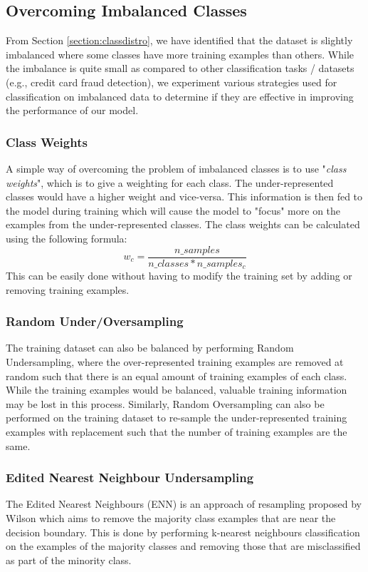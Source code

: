 \documentclass[sigconf,nonacm=true]{acmart}
\begin{document}
\subsection{Overcoming Imbalanced Classes}
\label{section:imbaclass}
From Section \ref{section:classdistro}, we have identified that the dataset is slightly imbalanced where
some classes have more training examples than others. While the imbalance is quite small as compared to 
other classification tasks / datasets (e.g., credit card fraud detection), we experiment various strategies 
used for classification on imbalanced data to determine if they are effective in improving the performance 
of our model.

\subsubsection{Class Weights}
\label{section:classweights}
A simple way of overcoming the problem of imbalanced classes is to use "\textit{class weights}", which is 
to give a weighting for each class. The under-represented classes would have a higher weight and vice-versa.
This information is then fed to the model during training which will cause the model to "focus" more on the 
examples from the under-represented classes. The class weights can be calculated using the following formula:
\begin{displaymath}
	w_c = \frac{n\_samples}{n\_classes * n\_samples_c}
\end{displaymath}
This can be easily done without having to modify the training set by adding or removing training examples.

\subsubsection{Random Under/Oversampling}
The training dataset can also be balanced by performing Random Undersampling, where the over-represented 
training examples are removed at random such that there is an equal amount of training examples of each class.
While the training examples would be balanced, valuable training information may be lost in this process.
Similarly, Random Oversampling can also be performed on the training dataset to re-sample the under-represented
training examples with replacement such that the number of training examples are the same.

\subsubsection{Edited Nearest Neighbour Undersampling}
The Edited Nearest Neighbours (ENN) is an approach of resampling proposed by Wilson \cite{4309137} 
which aims to remove the majority class examples that are near the decision boundary. This is done by 
performing k-nearest neighbours classification on the examples of the majority classes and removing those 
that are misclassified as part of the minority class.
\end{document}
